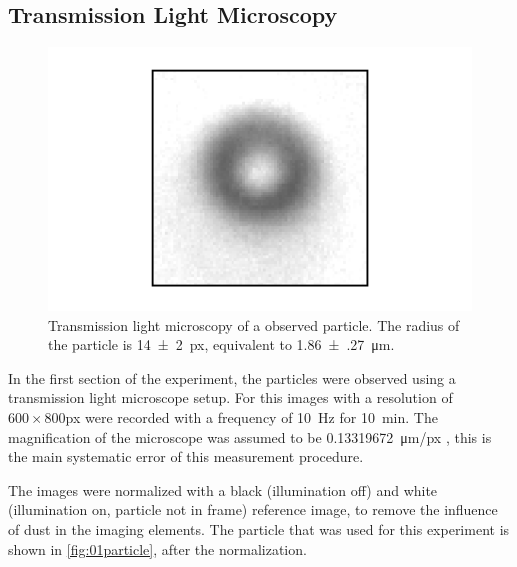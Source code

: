 \documentclass[
    twoside=false,
    twocolumn=true,
    fontsize=11pt,
]{scrarticle}
\begin{document}
\subsection{Transmission Light Microscopy}
\begin{figure}
    \centering
    \includegraphics{figures/01_01_1_particle.pdf}
    \caption{Transmission light microscopy of a observed particle. The radius of the particle is \SI{14(2)}{px}, equivalent to \SI{1.86(27)}{\micro m}.}
    \label{fig:01particle}
\end{figure}
In the first section of the experiment, the particles were observed using a transmission light microscope setup.
For this images with a resolution of $600\times 800$\si{px} were recorded with a frequency of \SI{10}{Hz} for \SI{10}{min}.
The magnification of the microscope was assumed to be \SI{0.13319672}{\micro m/px} \cite{instructions}, this is the main systematic error of this measurement procedure.

The images were normalized with a black (illumination off) and white (illumination on, particle not in frame) reference image, to remove the influence of dust in the imaging elements.
The particle that was used for this experiment is shown in \autoref{fig:01particle}, after the normalization.
\end{document}
